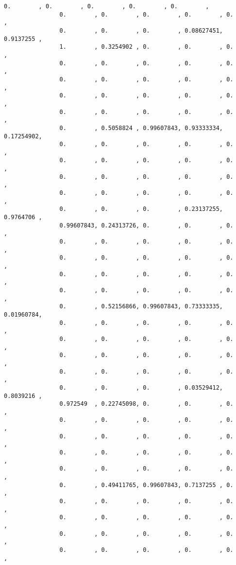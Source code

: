 \documentclass[11pt]{article}
\begin{document}
\begin{Verbatim}[commandchars=\\\{\}]
                0.        , 0.        , 0.        , 0.        , 0.        ,
                0.        , 0.        , 0.        , 0.        , 0.        ,
                0.        , 0.        , 0.        , 0.08627451, 0.9137255 ,
                1.        , 0.3254902 , 0.        , 0.        , 0.        ,
                0.        , 0.        , 0.        , 0.        , 0.        ,
                0.        , 0.        , 0.        , 0.        , 0.        ,
                0.        , 0.        , 0.        , 0.        , 0.        ,
                0.        , 0.        , 0.        , 0.        , 0.        ,
                0.        , 0.5058824 , 0.99607843, 0.93333334, 0.17254902,
                0.        , 0.        , 0.        , 0.        , 0.        ,
                0.        , 0.        , 0.        , 0.        , 0.        ,
                0.        , 0.        , 0.        , 0.        , 0.        ,
                0.        , 0.        , 0.        , 0.        , 0.        ,
                0.        , 0.        , 0.        , 0.23137255, 0.9764706 ,
                0.99607843, 0.24313726, 0.        , 0.        , 0.        ,
                0.        , 0.        , 0.        , 0.        , 0.        ,
                0.        , 0.        , 0.        , 0.        , 0.        ,
                0.        , 0.        , 0.        , 0.        , 0.        ,
                0.        , 0.        , 0.        , 0.        , 0.        ,
                0.        , 0.52156866, 0.99607843, 0.73333335, 0.01960784,
                0.        , 0.        , 0.        , 0.        , 0.        ,
                0.        , 0.        , 0.        , 0.        , 0.        ,
                0.        , 0.        , 0.        , 0.        , 0.        ,
                0.        , 0.        , 0.        , 0.        , 0.        ,
                0.        , 0.        , 0.        , 0.03529412, 0.8039216 ,
                0.972549  , 0.22745098, 0.        , 0.        , 0.        ,
                0.        , 0.        , 0.        , 0.        , 0.        ,
                0.        , 0.        , 0.        , 0.        , 0.        ,
                0.        , 0.        , 0.        , 0.        , 0.        ,
                0.        , 0.        , 0.        , 0.        , 0.        ,
                0.        , 0.49411765, 0.99607843, 0.7137255 , 0.        ,
                0.        , 0.        , 0.        , 0.        , 0.        ,
                0.        , 0.        , 0.        , 0.        , 0.        ,
                0.        , 0.        , 0.        , 0.        , 0.        ,
                0.        , 0.        , 0.        , 0.        , 0.        ,

\end{Verbatim}
\end{document}

